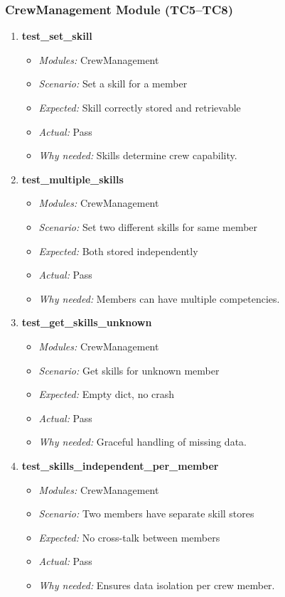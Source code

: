 \documentclass{article}
\begin{document}
\subsubsection*{CrewManagement Module (TC5--TC8)}
\begin{enumerate}[resume, label=\textbf{TC\arabic*.}]

\item \textbf{test\_set\_skill}
\begin{itemize}[noitemsep]
  \item \textit{Modules:} CrewManagement
  \item \textit{Scenario:} Set a skill for a member
  \item \textit{Expected:} Skill correctly stored and retrievable
  \item \textit{Actual:} Pass
  \item \textit{Why needed:} Skills determine crew capability.
\end{itemize}

\item \textbf{test\_multiple\_skills}
\begin{itemize}[noitemsep]
  \item \textit{Modules:} CrewManagement
  \item \textit{Scenario:} Set two different skills for same member
  \item \textit{Expected:} Both stored independently
  \item \textit{Actual:} Pass
  \item \textit{Why needed:} Members can have multiple competencies.
\end{itemize}

\item \textbf{test\_get\_skills\_unknown}
\begin{itemize}[noitemsep]
  \item \textit{Modules:} CrewManagement
  \item \textit{Scenario:} Get skills for unknown member
  \item \textit{Expected:} Empty dict, no crash
  \item \textit{Actual:} Pass
  \item \textit{Why needed:} Graceful handling of missing data.
\end{itemize}

\item \textbf{test\_skills\_independent\_per\_member}
\begin{itemize}[noitemsep]
  \item \textit{Modules:} CrewManagement
  \item \textit{Scenario:} Two members have separate skill stores
  \item \textit{Expected:} No cross-talk between members
  \item \textit{Actual:} Pass
  \item \textit{Why needed:} Ensures data isolation per crew member.
\end{itemize}

\end{enumerate}
\end{document}
